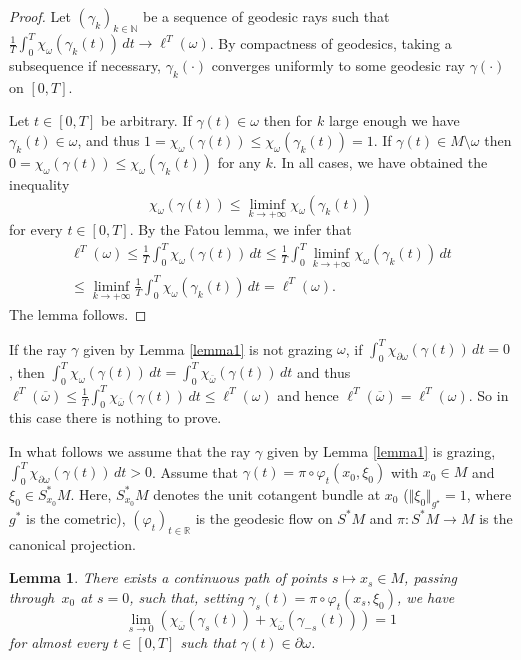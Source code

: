 \documentclass[JEP,XML,SOM,Unicode, NoEqCountersInSection,NoFloatCountersInSection,published]{cedram}
\def\R{\mathbb{R}}
\def\N{\mathbb{N}}
\newtheorem{lemma}{Lemma}
\theoremstyle{definition}
\begin{document}
\begin{proof}
Let $(\gamma_k)_{k\in\N}$ be a sequence of geodesic rays such that $\frac{1}{T}\int_0^T\chi_\omega(\gamma_k(t))\, dt \rightarrow \ell^T(\omega)$. By compactness of geodesics, {taking a subsequence if necessary,} $\gamma_k(\cdot)$ converges uniformly to some geodesic ray $\gamma(\cdot)$ on $[0,T]$.

Let $t\in[0,T]$ be arbitrary. If $\gamma(t)\in \omega$ then for $k$ large enough we have $\gamma_k(t)\in \omega$, and thus $1=\chi_{\omega}(\gamma(t))\leq \chi_{\omega}(\gamma_k(t))=1$. If $\gamma(t)\in M\setminus\omega$ then $0=\chi_{\omega}(\gamma(t))\leq \chi_{\omega}(\gamma_k(t))$ for any $k$. In all cases, we have obtained the inequality
\[
\chi_{\omega}(\gamma(t)) \leq \liminf_{k\rightarrow+\infty} \chi_{\omega}(\gamma_k(t))
\]
for every $t\in[0,T]$.
By the Fatou lemma, we infer that
\begin{multline*}
\ell^T(\omega)\leq \frac{1}{T}\int_0^T\chi_\omega(\gamma(t))\, dt \leq \frac{1}{T}\int_0^T \liminf_{k\rightarrow+\infty}\chi_\omega(\gamma_k(t))\, dt \\
\leq \liminf_{k\rightarrow+\infty} \frac{1}{T}\int_0^T \chi_\omega(\gamma_k(t))\, dt = \ell^T(\omega).
\end{multline*}
The lemma follows.
\end{proof}

If the ray $\gamma$ given by Lemma \ref{lemma1} is not grazing $\omega$, \ie if $\int_0^T\chi_{\partial\omega}(\gamma(t))\, dt=0$, then $\int_0^T\chi_{\omega}(\gamma(t))\, dt=\int_0^T\chi_{\overline\omega}(\gamma(t))\, dt$ and thus $\ell^T(\overline\omega)\leq \frac{1}{T} \int_0^T\chi_{\overline\omega}(\gamma(t))\, dt \leq \ell^T(\omega)$ and hence $\ell^T(\overline\omega)=\ell^T(\omega)$. So in this case there is nothing to prove.

In what follows we assume that the ray $\gamma$ given by Lemma \ref{lemma1} is grazing, \ie $\int_0^T\chi_{\partial\omega}(\gamma(t))\, dt>0$. Assume that $\gamma(t) = \pi\circ\varphi_t(x_0,\xi_0)$ with $x_0\in M$ and $\xi_0\in S_{x_0}^*M$. Here, $S_{x_0}^*M$ denotes the unit cotangent bundle at $x_0$ (\ie $\Vert\xi_0\Vert_{g^\star}=1$, where $g^*$ is the cometric), $(\varphi_t)_{t\in\R}$ is the geodesic flow on $S^*M$ and $\pi:S^*M\rightarrow M$ is the canonical projection.

\begin{lemma}\label{lemma2}
There exists a continuous path of points $s\mapsto x_s\in M$, passing through~$x_0$ at $s=0$, such that, setting $\gamma_s(t) = \pi\circ\varphi_t(x_s,\xi_0)$, we have
\begin{equation} \label{transverse}
\lim_{s\rightarrow 0} \left( \chi_{\overline\omega}(\gamma_s(t)) + \chi_{\overline\omega}(\gamma_{-s}(t)) \right) = 1
\end{equation}
for almost every $t\in[0,T]$ such that $\gamma(t)\in\partial\omega$.
\end{lemma}
\end{document}
